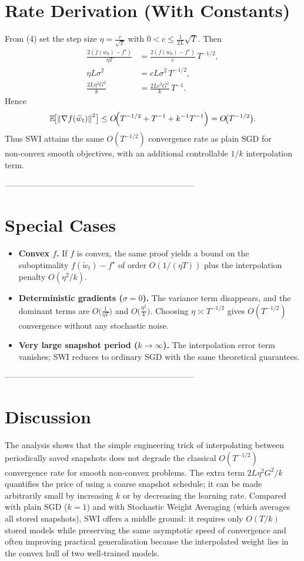 \documentclass{article}
\newcommand{\E}{\mathbb{E}}
\newcommand{\norm}[1]{\left\lVert #1\right\rVert}
\begin{document}
\section*{Rate Derivation (With Constants)}
From (4) set the step size $\eta = \frac{c}{\sqrt{T}}$ with $0<c\le \frac{1}{2L}\sqrt{T}$.  
Then
\[
\begin{aligned}
\frac{2(f(w_0)-f^{\star})}{\eta T}
    &= \frac{2(f(w_0)-f^{\star})}{c}\,T^{-1/2},\\
\eta L\sigma^2 &= cL\sigma^2\,T^{-1/2},\\
\frac{2L\eta^2 G^2}{k}
    &= \frac{2L c^2 G^2}{k}\,T^{-1}.
\end{aligned}
\]
Hence
\[
    \E\!\bigl[\norm{\nabla f(\widetilde w_t)}^2\bigr]
    \le
    O\!\Bigl(T^{-1/2}+T^{-1}+k^{-1}T^{-1}\Bigr)
    = O\!\bigl(T^{-1/2}\bigr).
\]
Thus SWI attains the same $O(T^{-1/2})$ convergence rate as plain SGD for non‑convex smooth objectives, with an additional controllable $1/k$ interpolation term.

---------------------------------------------------------------------

\section*{Special Cases}
\begin{itemize}
    \item \textbf{Convex $f$.} If $f$ is convex, the same proof yields a bound on the suboptimality $f(\widetilde w_t)-f^{\star}$ of order $O(1/(\eta T))$ plus the interpolation penalty $O(\eta^2/k)$.
    \item \textbf{Deterministic gradients ($\sigma=0$).} The variance term disappears, and the dominant terms are $O\bigl(\frac{1}{\eta T}\bigr)$ and $O\bigl(\frac{\eta^2}{k}\bigr)$. Choosing $\eta\asymp T^{-1/2}$ gives $O(T^{-1/2})$ convergence without any stochastic noise.
    \item \textbf{Very large snapshot period ($k\to\infty$).} The interpolation error term vanishes; SWI reduces to ordinary SGD with the same theoretical guarantees.
\end{itemize}

---------------------------------------------------------------------

\section*{Discussion}
The analysis shows that the simple engineering trick of interpolating between periodically saved snapshots does not degrade the classical $O(T^{-1/2})$ convergence rate for smooth non‑convex problems. The extra term $2L\eta^2 G^2/k$ quantifies the price of using a coarse snapshot schedule; it can be made arbitrarily small by increasing $k$ or by decreasing the learning rate. Compared with plain SGD ($k=1$) and with Stochastic Weight Averaging (which averages all stored snapshots), SWI offers a middle ground: it requires only $O(T/k)$ stored models while preserving the same asymptotic speed of convergence and often improving practical generalisation because the interpolated weight lies in the convex hull of two well‑trained models.
\end{document}
